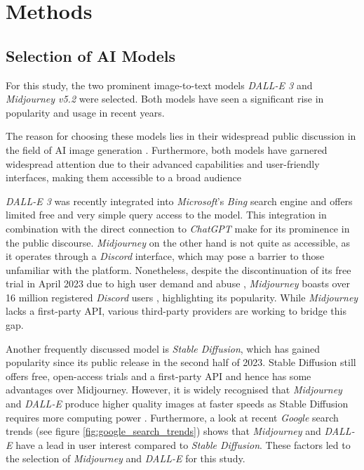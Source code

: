 \section{Methods}

\subsection{Selection of AI Models}
For this study, the two prominent image-to-text models \textit{DALL-E 3} and \textit{Midjourney v5.2} were selected. Both models have seen a significant rise in popularity and usage in recent years. 

The reason for choosing these models lies in their widespread public discussion in the field of AI image generation \parencite{Gibson2023, Gindham2023, Guiness2023}. Furthermore, both models have garnered widespread attention due to their advanced capabilities and user-friendly interfaces, making them accessible to a broad audience \parencite{Thomas2023}

\textit{DALL-E 3} was recently integrated into \textit{Microsoft}'s \textit{Bing} search engine and offers limited free and very simple query access to the \parencite{Bing2024} model. This integration in combination with the direct connection to \textit{ChatGPT} make for its prominence in the public discourse. \textit{Midjourney} on the other hand is not quite as accessible, as it operates through a \textit{Discord} interface, which may pose a barrier to those unfamiliar with the platform. Nonetheless, despite the discontinuation of its free trial in April 2023 due to high user demand and abuse \parencite{Weiss2023}, \textit{Midjourney} boasts over 16 million registered \textit{Discord} users \parencite{Krivec2023}, highlighting its popularity. While \textit{Midjourney} lacks a first-party API, various third-party providers are working to bridge this gap. 

Another frequently discussed model is \textit{Stable Diffusion}, which has gained popularity since its public release in the second half of 2023. Stable Diffusion still offers free, open-access trials and a first-party API and hence has some advantages over Midjourney. However, it is widely recognised that \textit{Midjourney} and \textit{DALL-E} produce higher quality images at faster speeds as Stable Diffusion requires more computing power \parencite{Kothari2023}. Furthermore, a look at recent \textit{Google} search trends (see figure \ref{fig:google_search_trends}) shows that \textit{Midjourney} and \textit{DALL-E} have a lead in user interest compared to \textit{Stable Diffusion}. These factors led to the selection of  \textit{Midjourney} and \textit{DALL-E} for this study.

